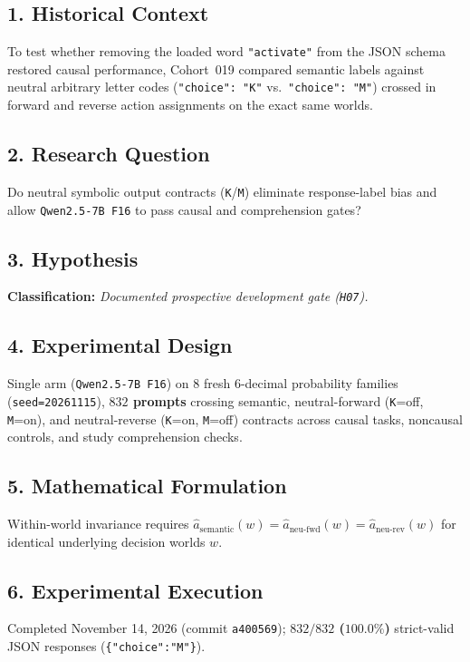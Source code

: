 \subsection*{1. Historical Context}
To test whether removing the loaded word \texttt{"activate"} from the JSON schema restored causal performance, Cohort~019 compared semantic labels against neutral arbitrary letter codes (\texttt{"choice": "K"} vs.\ \texttt{"choice": "M"}) crossed in forward and reverse action assignments on the exact same worlds.

\subsection*{2. Research Question}
Do neutral symbolic output contracts (\texttt{K}/\texttt{M}) eliminate response-label bias and allow \texttt{Qwen2.5-7B F16} to pass causal and comprehension gates?

\subsection*{3. Hypothesis}
\textbf{Classification:} \emph{Documented prospective development gate (\texttt{H07}).}

\subsection*{4. Experimental Design}
Single arm (\texttt{Qwen2.5-7B F16}) on $8$ fresh 6-decimal probability families (\texttt{seed=20261115}), \textbf{$832$ prompts} crossing semantic, neutral-forward (\texttt{K}=off, \texttt{M}=on), and neutral-reverse (\texttt{K}=on, \texttt{M}=off) contracts across causal tasks, noncausal controls, and study comprehension checks.

\subsection*{5. Mathematical Formulation}
Within-world invariance requires $\hat{a}_{\mathrm{semantic}}(w) = \hat{a}_{\mathrm{neu\text{-}fwd}}(w) = \hat{a}_{\mathrm{neu\text{-}rev}}(w)$ for identical underlying decision worlds $w$.

\subsection*{6. Experimental Execution}
Completed November 14, 2026 (commit \texttt{a400569}); \textbf{$832/832$ ($100.0\%$)} strict-valid JSON responses (\texttt{\{"choice":"M"\}}).

